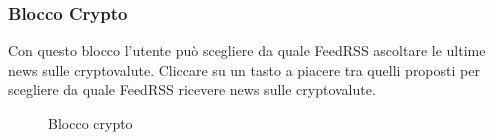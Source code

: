 \subsubsection{Blocco Crypto}
Con questo blocco l'utente può scegliere da quale FeedRSS ascoltare le ultime news sulle cryptovalute.
Cliccare su un tasto a piacere tra quelli proposti per scegliere da quale FeedRSS ricevere news sulle cryptovalute.
\begin{figure}[!ht]
	\centering
	\caption{Blocco crypto}
\end{figure}
\newpage
